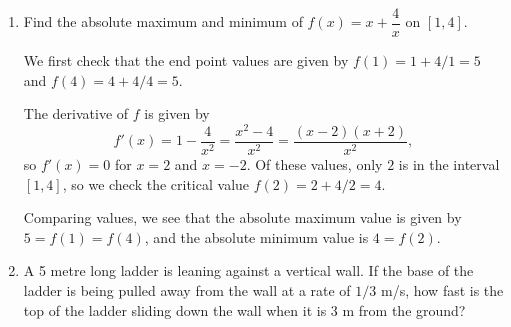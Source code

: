 \documentclass[12pt]{article}
\newcommand{\points}[1]{\marginpar{\hspace{24pt}[#1]}}
\begin{document}
\thispagestyle{fancy}

 \begin{enumerate}
 \item  Find the absolute maximum and minimum of $f(x)=x+\dfrac{4}{x}$ on $[1,4]$. \points{4}

\medskip

 We first check that the end point values are given by $f(1) = 1+4/1 =5$ and $f(4) = 4+4/4=5$.

 The derivative of $f$ is given by
\[
 f'(x) = 1-\frac{4}{x^2} = \frac{x^2-4}{x^2} = \frac{(x-2)(x+2)}{x^2},
\]
 so $f'(x)=0$ for $x=2$ and $x=-2$. Of these values, only $2$ is in the interval $[1,4]$, so we check the critical value $f(2) = 2+4/2 = 4$.

 Comparing values, we see that the absolute maximum value is given by $5=f(1)=f(4)$, and the absolute minimum value is $4=f(2)$.

 \bigskip

 \item A 5 metre long ladder is leaning against a vertical wall. If the base of the ladder is being pulled away from the wall at a rate of $1/3$ m/s, how fast is the top of the ladder sliding down the wall when it is 3 m from the ground? \points{4}\\
 

\end{enumerate}
\end{document}
